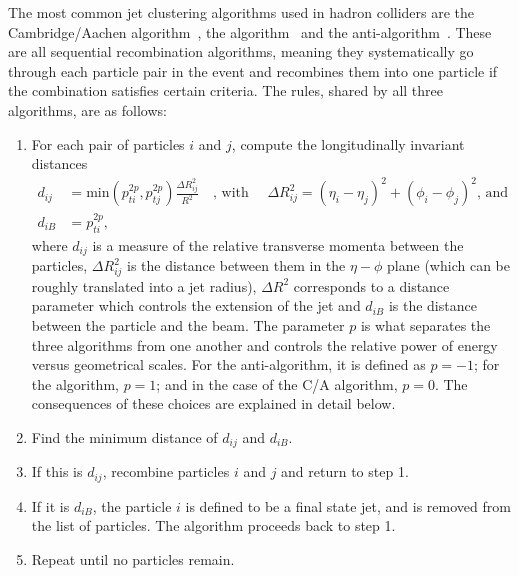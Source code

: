 The most common jet clustering algorithms used in hadron colliders are the Cambridge/Aachen algorithm~\cite{Dokshitzer:1997in}, the \kt algorithm~\cite{Ellis:1993tq} and the anti-\kt algorithm~\cite{Cacciari:2008gp}. These are all sequential recombination algorithms, meaning they systematically go through each particle pair in the event and recombines them into one particle if the combination satisfies certain criteria. The rules, shared by all three algorithms, are as follows:
\begin{enumerate}
  \itemsep0em 
\item For each pair of particles $i$ and $j$, compute the longitudinally invariant distances
  \begin{align}
    \label{eq:objreco:jetclustering1}  
  d_{ij} &= \textrm{min}(p_{ti}^{2p},p_{tj}^{2p})\frac{\Delta R^2_{ij}}{R^2} \quad \textrm{, with } \quad \Delta R^2_{ij}=(\eta_i - \eta_j)^2+(\phi_i - \phi_j)^2 \textrm{, and }\\
  \label{eq:objreco:jetclustering2}  
  d_{iB} &= p_{ti}^{2p},
  \end{align}  
  where $d_{ij}$ is a measure of the relative transverse momenta between the particles, $\Delta R^2_{ij}$ is the distance between them in the $\eta-\phi$ plane (which can be roughly translated into a jet radius), $\Delta R^2$ corresponds to a distance parameter which controls the extension of the jet and $d_{iB}$ is the distance between the particle and the beam. The parameter $p$ is what separates the three algorithms from one another and controls the relative power of energy versus geometrical
scales. For the anti-\kt algorithm, it is defined as $p=-1$; for the \kt algorithm, $p=1$; and in the case of the C/A algorithm, $p=0$. The consequences of these choices are explained in detail below.
  \item Find the minimum distance of $d_{ij}$ and $d_{iB}$.
  \item If this is $d_{ij}$, recombine particles $i$ and $j$ and return to step 1.
  \item If it is $d_{iB}$, the particle $i$ is defined to be a final state jet, and is removed from the list of particles. The algorithm proceeds back to step 1.
  \item Repeat until no particles remain.
\end{enumerate}

